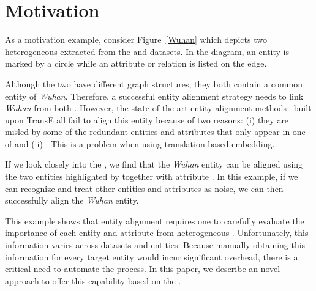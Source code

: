 \section{Motivation}
As a motivation example, consider Figure~\ref{Wuhan} which depicts two heterogeneous \KGs extracted from the  and 
datasets. In the diagram, an entity is marked by a circle while an attribute or relation is listed on the edge.

Although the two \KGs have different graph structures, they both contain a common entity of \emph{Wuhan}. Therefore, a successful entity
alignment strategy needs to link \emph{Wuhan} from both \KGs. However, the state-of-the art entity alignment methods~\cite{} built upon
TransE all fail to align this entity because of two reasons: (i) they are misled by some of the redundant entities and attributes that only
appear in one of \KGs and (ii) . This is a problem when using translation-based embedding.

If we look closely into the \KGs, we find that the \emph{Wuhan} entity can be aligned using the two entities highlighted by  together with attribute . In this example, if we can recognize and treat other entities and attributes as noise, we can
then successfully align the \emph{Wuhan} entity.

This example shows that entity alignment requires one to carefully evaluate the importance of each entity and attribute from heterogeneous
\KGs. Unfortunately, this information varies across datasets and entities. Because manually obtaining this information for every target
entity would incur significant overhead, there is a critical need to automate the process. In this paper, we describe an novel approach to
offer this capability based on the \GCN.
